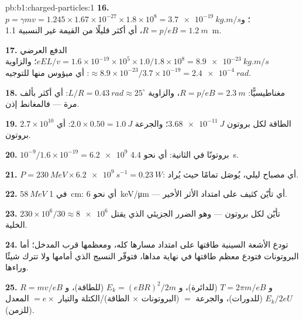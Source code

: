 \begin{solution}{pb:b1:charged-particles:1}
\textbf{16.} $p = \gamma mv = 1.245 \times 1.67\times10^{-27} \times 1.8\times10^8
= \qty{3.7e-19}{kg.m/s}$؛ و $R = p/eB = \qty{1.2}{m}$، أي أكثر قليلًا من
القيمة غير النسبية \qty{1.1}{m}.

\textbf{17.} الدفع العرضي $eEL/v = 1.6\times10^{-19} \times 10^5 \times
1.0/1.8\times10^8 = \qty{8.9e-23}{kg.m/s}$؛ والزاوية $\approx 8.9\times10^{-23}/
3.7\times10^{-19} = \qty{2.4e-4}{rad}$: أي ميؤوس منها للتوجيه.

\textbf{18.} مغناطيسيًّا: $R = p/eB = \qty{2.3}{m}$، والزاوية $L/R = \qty{0.43}{rad}
\approx 25^\circ$: أي أكثر بألف مرة --- فالمغانط إذن.

\textbf{19.} الطاقة لكل بروتون $\qty{3.68e-11}{J}$؛ والجرعة $2.0 \times 0.50 =
\qty{1.0}{J}$: أي $2.7\times10^{10}$ بروتون.

\textbf{20.} $10^{-9}/1.6\times10^{-19} = \num{6.2e9}$ بروتونًا في الثانية: أي نحو
\qty{4.4}{s}.

\textbf{21.} $P = \qty{230}{MeV} \times \qty{6.2e9}{s^{-1}} = \qty{0.23}{W}$:
أي مصباح ليلي، يُوصَل تمامًا حيث يُراد.

\textbf{22.} $\qty{58}{MeV}$ في \qty{1}{cm}: أي نحو \qty{6}{keV/\micro m} ---
أي تأيّن كثيف على امتداد الأثر الأخير.

\textbf{23.} $230\times10^6/30 \approx \num{8e6}$ تأيّن لكل بروتون ---
وهو الضرر الجزيئي الذي يقتل الخلية.

\textbf{24.} تودع الأشعة السينية طاقتها على امتداد مسارها كله، ومعظمها قرب
المدخل؛ أما البروتونات فتودع معظم طاقتها في نهاية مداها،
فتوفّر النسيج الذي أمامها ولا تترك شيئًا وراءها.

\textbf{25.} $R = mv/eB$ و $T = 2\pi m/eB$ (للدائرة)، و $E_k = (eBR)^2/2m$
(للطاقة)، و $E_k/2eU$ (للدورات)، والجرعة $=$ (البروتونات $\times$ الطاقة)/الكتلة
والتيار $= e \times$ المعدل (للزمن).
\end{solution}
